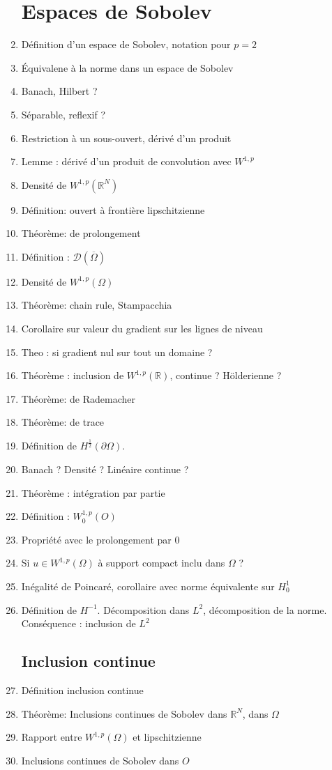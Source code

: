 \documentclass{article}
\begin{document}
\begin{enumerate}
\section{Espaces de Sobolev}
	\item Définition d'un espace de Sobolev, notation pour $p=2$
	\item Équivalene à la norme dans un espace de Sobolev
	\item Banach, Hilbert ?
	\item Séparable, reflexif ?
	\item Restriction à un sous-ouvert, dérivé d'un produit
	\item Lemme : dérivé d'un produit de convolution avec $W^{1,p}$
	\item Densité de $W^{1,p}(\mathbb{R}^N)$
	\item Définition: ouvert à frontière lipschitzienne
	\item Théorème: de prolongement
	\item Définition : $\mathcal{D}(\overline{\Omega})$
	\item Densité de $W^{1,p}(\Omega)$
	\item Théorème: chain rule, Stampacchia
	\item Corollaire sur valeur du gradient sur les lignes de niveau
	\item Theo : si gradient nul sur tout un domaine ?
	\item Théorème : inclusion de $W^{1,p}(\mathbb{R})$, continue ? Hölderienne ?
	\item Théorème: de Rademacher
	\item Théorème: de trace
	\item Définition de $H^{\frac{1}{2}}(\partial\Omega)$.
	\item Banach ? Densité ? Linéaire continue ? 
	\item Théorème : intégration par partie
	\item Définition : $W_0^{1,p}(O)$
	\item Propriété avec le prolongement par $0$
	\item Si $u\in W^{1,p}(\Omega)$ à support compact inclu dans $\Omega$ ?
	\item Inégalité de Poincaré, corollaire avec norme équivalente sur $H^1_0$
	\item Définition de $H^{-1}$. Décomposition dans $L^2$, décomposition de la norme. Conséquence : inclusion de $L^2$
\subsection{Inclusion continue}
	\item Définition inclusion continue
	\item Théorème: Inclusions continues de Sobolev dans $\mathbb{R}^N$, dans $\Omega$
	\item Rapport entre $W^{1,p}(\Omega)$ et lipschitzienne
	\item Inclusions continues de Sobolev dans $O$

\end{enumerate}
\end{document}
